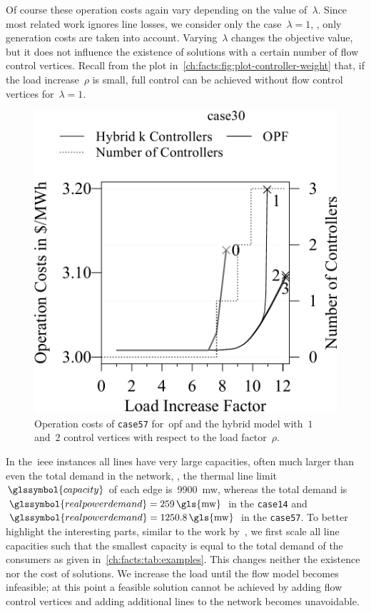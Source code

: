 Of course these operation costs again vary depending on the value of~$\lambda$.
Since most related work ignores line losses, we consider only the case~$\lambda
= 1$, \ie, only generation costs are taken into account.  Varying~$\lambda$
changes the objective value, but it does not influence the existence of
solutions with a certain number of flow control vertices.  Recall from the plot
in~\cref{ch:facts:fig:plot-controller-weight} that, if the load increase~$\rho$
is small, full control can be achieved without flow control vertices 
for~$\lambda = 1$.
%
\begin{figure}[t!]
    \centering
    \includegraphics[width=\plotscaleOne\linewidth, page=7]{factsplacement/plots/plotCapacityReductionVsCostsController.pdf}
    \caption[Operation costs of \texttt{case57}.]{Operation costs of
    \texttt{case57} for~\gls{opf} and the hybrid model with~$1$ and~$2$
    control vertices with respect to the load factor~$\rho$.}
    \label{ch:facts:fig:plot-capacity-cost-controller}
\end{figure}
%
In the~\gls{ieee} instances all lines have very large capacities, often
much larger than even the total demand in the network, \eg,
the thermal line limit~$\glssymbol{capacity}$ of each edge is~\SI{9900}{
\gls{mw}}, whereas the total demand is~$\glssymbol{realpowerdemand} =
\SI{259}{\gls{mw}}$ in the \texttt{case14} and~$\glssymbol{realpowerdemand} =
\SI{1250.8}{\gls{mw}}$ in the \texttt{case57}. To better highlight the
interesting parts, similar to the work by~\textcite{lgkm-psp-03}, we first scale
all line capacities such that the smallest capacity is equal to the total demand
of the consumers as given in~\cref{ch:facts:tab:examples}. This changes neither
the existence nor the cost of solutions.  We increase the load until the flow
model becomes infeasible; at this point a feasible solution cannot be achieved
by adding flow control vertices and adding additional lines to the network
becomes unavoidable.

